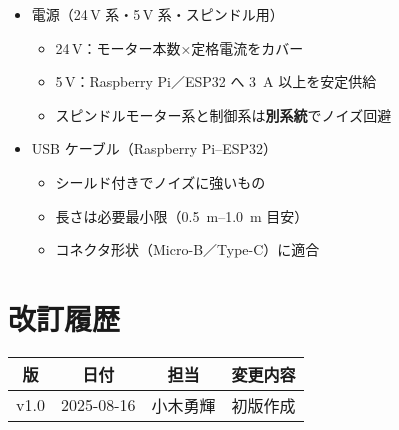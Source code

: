 \documentclass[uplatex,dvipdfmx]{ujarticle}
\begin{document}
\begin{itemize}
\begin{itemize}
      \item \SIrange{200}{400}{\watt} 以上を目安
    \end{itemize}
  \item 電源（24\,V 系・5\,V 系・スピンドル用）
    \begin{itemize}
      \item 24\,V：モーター本数×定格電流をカバー
      \item 5\,V：Raspberry Pi／ESP32 へ \SI{3}{\ampere} 以上を安定供給
      \item スピンドルモーター系と制御系は\textbf{別系統}でノイズ回避
    \end{itemize}
  \item USB ケーブル（Raspberry Pi--ESP32）
    \begin{itemize}
      \item シールド付きでノイズに強いもの
      \item 長さは必要最小限（\SIrange{0.5}{1.0}{\meter} 目安）
      \item コネクタ形状（Micro-B／Type-C）に適合
    \end{itemize}
\end{itemize}

\section*{改訂履歴}
\begin{tabular}{|c|c|c|p{8cm}|}
\hline
版 & 日付 & 担当 & 変更内容 \\
\hline
v1.0 & 2025-08-16 & 小木勇輝 & 初版作成 \\
\hline

\end{tabular}


\end{document}
